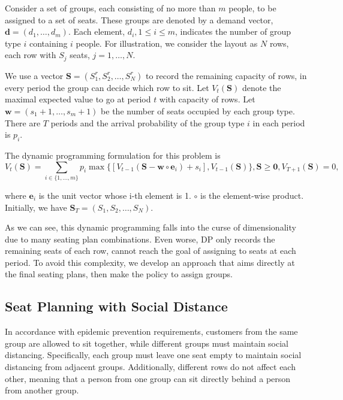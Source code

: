 Consider a set of groups, each consisting of no more than $m$ people, to be assigned to a set of seats. These groups are denoted by a demand vector, $\mathbf{d} = (d_1, \ldots, d_m)$. Each element, $d_i, 1 \leq i \leq m$, indicates the number of group type $i$ containing $i$ people. For illustration, we consider the layout as $N$ rows, each row with $S_{j}$ seats, $j = 1, \ldots, N$. 


We use a vector $\mathbf{S}= (S^{r}_1, S^{r}_2, \ldots, S^{r}_{N})$ to record the remaining capacity of rows, in every period the group can decide which row to sit. Let $V_{t}(\mathbf{S})$ denote the maximal expected value to go at period $t$ with capacity of rows. Let $\mathbf{w} = (s_1+1, \ldots, s_m+1)$ be the number of seats occupied by each group type. There are $T$ periods and the arrival probability of the group type $i$ in each period is $p_i$. 

The dynamic programming formulation for this problem is
$$V_{t}(\mathbf{S}) = \sum_{i \in \{1,\ldots,m\}} p_i \max\{ {[V_{t-1}(\mathbf{S}- \mathbf{w} \circ \mathbf{e}_{i})+ s_i]}, {V_{t-1}(\mathbf{S})}\}, \mathbf{S} \geq \mathbf{0}, V_{T+1}(\mathbf{S}) = 0,$$

where $\mathbf{e}_{i}$ is the unit vector whose i-th element is 1. $\circ$ is the element-wise product. Initially, we have $\mathbf{S}_{T} = (S_1, S_2, \ldots, S_{N})$. 

As we can see, this dynamic programming falls into the curse of dimensionality due to many seating plan combinations. Even worse, DP only records the remaining seats of each row, cannot reach the goal of assigning to seats at each period. To avoid this complexity, we develop an approach that aims directly at the final seating plans, then make the policy to assign groups. 




\subsection{Seat Planning with Social Distance}


In accordance with epidemic prevention requirements, customers from the same group are allowed to sit together, while different groups must maintain social distancing. Specifically, each group must leave one seat empty to maintain social distancing from adjacent groups. Additionally, different rows do not affect each other, meaning that a person from one group can sit directly behind a person from another group.

